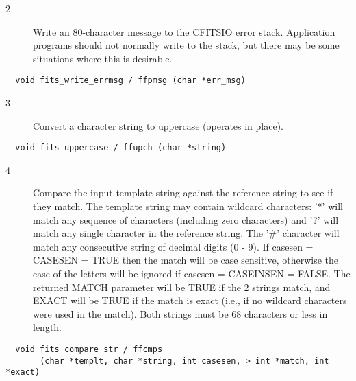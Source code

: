 \documentclass[11pt]{book}
\begin{document}
\begin{description}
\item[2 ] Write an 80-character message to the CFITSIO error stack.  Application
    programs should not normally write to the stack, but there may be
   some situations where this is desirable. \label{ffpmsg}
\end{description}

\begin{verbatim}
  void fits_write_errmsg / ffpmsg (char *err_msg)
\end{verbatim}

\begin{description}
\item[3 ] Convert a character string to uppercase (operates in place). \label{ffupch}
\end{description}

\begin{verbatim}
  void fits_uppercase / ffupch (char *string)
\end{verbatim}

\begin{description}
\item[4 ] Compare the input template string against the reference string
    to see if they match.  The template string may contain wildcard
    characters: '*' will match any sequence of characters (including
    zero characters) and '?' will match any single character in the
    reference string.  The '\#' character will match any consecutive string
    of decimal digits (0 - 9).  If casesen = CASESEN = TRUE then the match will
    be case sensitive, otherwise the case of the letters will be ignored
    if casesen = CASEINSEN = FALSE.  The returned MATCH parameter will be
    TRUE if the 2 strings match, and EXACT will be TRUE if the match is
    exact (i.e., if no wildcard characters were used in the match).
   Both strings must be 68 characters or less in length. \label{ffcmps}
\end{description}

\begin{verbatim}
  void fits_compare_str / ffcmps
       (char *templt, char *string, int casesen, > int *match, int *exact)
\end{verbatim}
\end{document}
